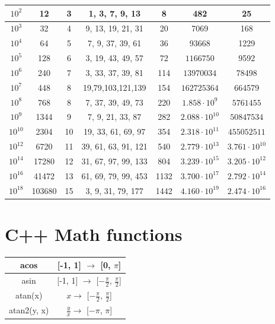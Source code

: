 	\setlength{\tabcolsep}{2pt}
	\begin{tabular}{|c|c|c|c|c|c|c|}
	\hline
	$10^2$    & 12     & 3  & 1, 3, 7, 9, 13        & 8    & 482                   & 25                   \\ \hline
	$10^3$    & 32     & 4  & 9, 13, 19, 21, 31     & 20   & 7069                  & 168                  \\ \hline
	$10^4$    & 64     & 5  & 7, 9, 37, 39, 61      & 36   & 93668                 & 1229                 \\ \hline
	$10^5$    & 128    & 6  & 3, 19, 43, 49, 57     & 72   & $1166750$             & 9592                 \\ \hline
	$10^6$    & 240    & 7  & 3, 33, 37, 39, 81     & 114  & $13970034$            & 78498                \\ \hline
	$10^7$    & 448    & 8  & 19,79,103,121,139 & 154  & $162725364$           & 664579               \\ \hline
	$10^8$    & 768    & 8  & 7, 37, 39, 49, 73     & 220  & $1.858 \cdot 10^{9}$  & $5761455$            \\ \hline
	$10^9$    & 1344   & 9  & 7, 9, 21, 33, 87      & 282  & $2.088 \cdot 10^{10}$ & $50847534$           \\ \hline
	$10^{10}$ & 2304   & 10 & 19, 33, 61, 69, 97    & 354  & $2.318 \cdot 10^{11}$ & $455052511$          \\ \hline
	$10^{12}$ & 6720   & 11 & 39, 61, 63, 91, 121   & 540  & $2.779 \cdot 10^{13}$ & $3.761 \cdot 10^{10}$ \\ \hline
	$10^{14}$ & 17280  & 12 & 31, 67, 97, 99, 133   & 804  & $3.239 \cdot 10^{15}$ & $3.205 \cdot 10^{12}$ \\ \hline
	$10^{16}$ & 41472  & 13 & 61, 69, 79, 99, 453   & 1132 & $3.700 \cdot 10^{17}$ & $2.792 \cdot 10^{14}$ \\ \hline
	$10^{18}$ & 103680 & 15 & 3, 9, 31, 79, 177     & 1442 & $4.160 \cdot 10^{19}$ & $2.474 \cdot 10^{16}$ \\ \hline
	\end{tabular}

\section{C++ Math functions}
	\begin{tabular}{|c|c|} \hline
		acos & [-1, 1] $\rightarrow$ [0, $\pi$] \\ \hline
		asin & [-1, 1] $\rightarrow$ [$-\frac{\pi}{2}$, $\frac{\pi}{2}$] \\ \hline
		atan(x) & $x \rightarrow$ [$-\frac{\pi}{2}$, $\frac{\pi}{2}$] \\ \hline
		atan2(y, x) & $\frac{y}{x} \rightarrow$ [$-\pi$, $\pi$] \\ \hline
	\end{tabular}






